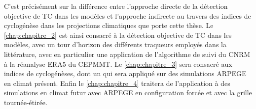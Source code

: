 \documentclass[../main.tex]{subfiles}
\begin{document}
C'est précisément sur la différence entre l'approche directe de la détection objective de TC dans les modèles et l'approche indirecte au travers des indices de
cyclogénèse dans les projections climatiques que porte cette thèse. Le \cref{chap:chapitre_2} est ainsi consacré à la détection objective de TC dans les
modèles, avec un tour d'horizon des différents traqueurs employés dans la littérature, avec en particulier une application de l'algorithme de suivi du CNRM à la
réanalyse ERA5 du CEPMMT. Le \cref{chap:chapitre_3} sera consacré aux indices de cyclogénèses, dont un qui sera appliqué sur des simulations ARPEGE en climat
présent. Enfin le \cref{chap:chapitre_4} traitera de l'application à des simulations en climat futur avec ARPEGE en configuration forcée et avec la grille
tournée-étirée.
\end{document}
